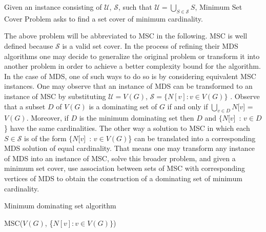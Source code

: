 \begin{definition}
Given an instance consisting of $\mathcal{U}$, $\mathcal{S}$, such that $\mathcal{U} = \bigcup_{S\in\mathcal{S}} S$, Minimum Set Cover Problem asks to find a set cover of minimum cardinality.
\end{definition}
The above problem will be abbreviated to MSC in the following. MSC is well defined because $\mathcal{S}$ is a valid set cover. In the process of refining their MDS algorithms one may decide to generalize the original problem or transform it into another problem in order to achieve a better complexity bound for the algorithm. In the case of MDS, one of such ways to do so is by considering equivalent MSC instances. One may observe that an instance of MDS can be transformed to an instance of MSC by substituting $\mathcal{U} = V(G)$, $\mathcal{S} = \{N[v] : v\in V(G)\}$ \cite{VANROOIJ20112147}. Observe that a subset $D$ of $V(G)$ is a dominating set of $G$ if and only if $\bigcup_{v\in D} N$[$v$] = $V(G)$. Moreover, if $D$ is the minimum dominating set then $D$ and $\{N$[$v$]\ : $v\in D$\} have the same cardinalities. The other way a solution to MSC in which each $S\in \mathcal{S}$ is of the form $\{N$[$v$]\ : $v\in V(G)$\} can be translated into a corresponding MDS solution of equal cardinality. That means one may transform any instance of MDS into an instance of MSC, solve this broader problem, and given a minimum set cover, use association between sets of MSC with corresponding vertices of MDS to obtain the construction of a dominating set of minimum cardinality.
\begin{algorithm}
\caption{Minimum dominating set algorithm}\label{alg:mds_to_msc}
\begin{algorithmic}[1]
\State MSC($V(G)$, \{$N[v] : v\in V(G)\}$)
\EndProcedure
\end{algorithmic}
\end{algorithm}

